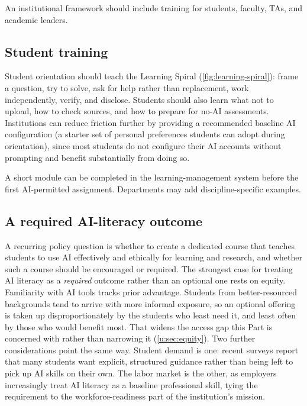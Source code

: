 \documentclass{SIAMbook2023}
\begin{document}
An institutional framework should include training for students, faculty, TAs, and academic leaders.

\subsection{Student training}
\label{u:subsec:student-training}

Student orientation should teach the Learning Spiral (\cref{fig:learning-spiral}): frame a question, try to solve, ask for help rather than replacement, work independently, verify, and disclose. Students should also learn what not to upload, how to check sources, and how to prepare for no-AI assessments. Institutions can reduce friction further by providing a recommended baseline AI configuration (a starter set of personal preferences students can adopt during orientation), since most students do not configure their AI accounts without prompting and benefit substantially from doing so.

A short module can be completed in the learning-management system before the first AI-permitted assignment. Departments may add discipline-specific examples.

\subsection{A required AI-literacy outcome}
\label{u:subsec:ai-literacy-requirement}%

A recurring policy question is whether to create a dedicated course that teaches students to use AI effectively and ethically for learning and research, and whether such a course should be encouraged or required. The strongest case for treating AI literacy as a \emph{required} outcome rather than an optional one rests on equity. Familiarity with AI tools tracks prior advantage. Students from better-resourced backgrounds tend to arrive with more informal exposure, so an optional offering is taken up disproportionately by the students who least need it, and least often by those who would benefit most. That widens the access gap this Part is concerned with rather than narrowing it (\cref{u:sec:equity}). Two further considerations point the same way. Student demand is one: recent surveys report that many students want explicit, structured guidance rather than being left to pick up AI skills on their own. The labor market is the other, as employers increasingly treat AI literacy as a baseline professional skill, tying the requirement to the workforce-readiness part of the institution's mission.
\end{document}
